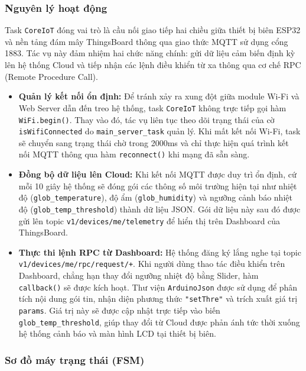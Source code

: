 \subsubsection{Nguyên lý hoạt động}

Task \texttt{CoreIoT} đóng vai trò là cầu nối giao tiếp hai chiều giữa thiết bị biên ESP32 và nền tảng đám mây ThingsBoard thông qua giao thức MQTT sử dụng cổng 1883. Tác vụ này đảm nhiệm hai chức năng chính: gửi dữ liệu cảm biến định kỳ lên hệ thống Cloud và tiếp nhận các lệnh điều khiển từ xa thông qua cơ chế RPC (Remote Procedure Call).

\begin{itemize}
    \item \textbf{Quản lý kết nối ổn định:} Để tránh xảy ra xung đột giữa module Wi-Fi và Web Server dẫn đến treo hệ thống, task \texttt{CoreIoT} không trực tiếp gọi hàm \texttt{WiFi.begin()}. Thay vào đó, tác vụ liên tục theo dõi trạng thái của cờ \texttt{isWifiConnected} do \texttt{main\_server\_task} quản lý. Khi mất kết nối Wi-Fi, task sẽ chuyển sang trạng thái chờ trong 2000ms và chỉ thực hiện quá trình kết nối MQTT thông qua hàm \texttt{reconnect()} khi mạng đã sẵn sàng.
    
    \item \textbf{Đồng bộ dữ liệu lên Cloud:} Khi kết nối MQTT được duy trì ổn định, cứ mỗi 10 giây hệ thống sẽ đóng gói các thông số môi trường hiện tại như nhiệt độ (\texttt{glob\_temperature}), độ ẩm (\texttt{glob\_humidity}) và ngưỡng cảnh báo nhiệt độ (\texttt{glob\_temp\_threshold}) thành dữ liệu JSON. Gói dữ liệu này sau đó được gửi lên topic \texttt{v1/devices/me/telemetry} để hiển thị trên Dashboard của ThingsBoard.
    
    \item \textbf{Thực thi lệnh RPC từ Dashboard:} Hệ thống đăng ký lắng nghe tại topic \texttt{v1/devices/me/rpc/request/+}. Khi người dùng thao tác điều khiển trên Dashboard, chẳng hạn thay đổi ngưỡng nhiệt độ bằng Slider, hàm \texttt{callback()} sẽ được kích hoạt. Thư viện \texttt{ArduinoJson} được sử dụng để phân tích nội dung gói tin, nhận diện phương thức \texttt{"setThre"} và trích xuất giá trị \texttt{params}. Giá trị này sẽ được cập nhật trực tiếp vào biến \texttt{glob\_temp\_threshold}, giúp thay đổi từ Cloud được phản ánh tức thời xuống hệ thống cảnh báo và màn hình LCD tại thiết bị biên.
\end{itemize}

\subsubsection{Sơ đồ máy trạng thái (FSM)}


